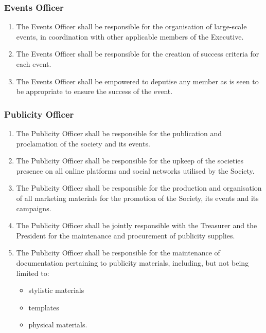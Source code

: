 \documentclass[parskip=half]{scrartcl}
\begin{document}
            \subsubsection{Events Officer}
                \label{executive--executive-positions--events-officer}
                \begin{enumerate}
                    \item The Events Officer shall be responsible for the organisation of large-scale events, in coordination with other applicable members of the Executive.
                    
                    \item The Events Officer shall be responsible for the creation of success criteria for each event.
                    
                    \item The Events Officer shall be empowered to deputise any member as is seen to be appropriate to ensure the success of the event.
                \end{enumerate}
            
            \subsubsection{Publicity Officer}
                \label{executive--executive-positions--publicity-officer}
                \begin{enumerate}
                    \item The Publicity Officer shall be responsible for the publication and proclamation of the society and its events.
                    
                    \item The Publicity Officer shall be responsible for the upkeep of the societies presence on all online platforms and social networks utilised by the Society.
                    
                    \item The Publicity Officer shall be responsible for the production and organisation of all marketing materials for the promotion of the Society, its events and its campaigns.
                    
                    \item The Publicity Officer shall be jointly responsible with the Treasurer and the President for the maintenance and procurement of publicity supplies.
                    
                    \item The Publicity Officer shall be responsible for the maintenance of documentation pertaining to publicity materials, including, but not being limited to:
                    \begin{itemize}
                        \item stylistic materials 
                        \item templates
                        \item physical materials.
                    \end{itemize}
                \end{enumerate}
            
\end{document}
